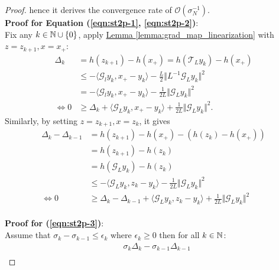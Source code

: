 \documentclass[12pt]{article}
\begin{document}
\begin{proof}
        hence it derives the convergence rate of $\mathcal O(\sigma_{N}^{-1})$. 
        \\
        \textbf{Proof for Equation (\ref*{eqn:st2p-1}, \ref*{eqn:st2p-2})}:
        \\
        Fix any $k \in \mathbb N\cup \{0\}$, apply
        \hyperref[lemma:grad_map_linearization]
        {Lemma \ref*{lemma:grad_map_linearization}}
        with $z = z_{k + 1}, x = x_+$: 
        \begin{align*}
            \Delta_k &= h(z_{k + 1}) - h(x_+) = h(\mathcal T_L y_k) - h(x_+) 
            \\
            &\le 
            - \langle \mathcal G_l y_k, x_+ - y_k \rangle 
            - \frac{L}{2}\Vert L^{-1} \mathcal G_Ly_k\Vert^2
            \\
            &= 
            - \langle \mathcal G_l y_k, x_+ - y_k \rangle 
            - \frac{1}{2L}\Vert \mathcal G_L y_k\Vert^2
            \\
            \iff 
            0& \ge \Delta_k + \langle \mathcal G_L y_k, x_+ - y_k\rangle + \frac{1}{2L}\Vert \mathcal G_L y_k\Vert^2. 
        \end{align*}
        Similarly, by setting $z = z_{k + 1}, x = z_k$, it gives 
        \begin{align*}
            \Delta_k - \Delta_{k - 1} &= 
            h(z_{k + 1}) - h(x_+) - (h(z_k) - h(x_+)) 
            \\
            &= h(z_{k + 1}) - h(z_k)
            \\
            &= h( \mathcal G_L y_k) - h(z_k)
            \\
            &\le 
            - \langle \mathcal G_L y_k, z_k - y_k\rangle - 
            \frac{1}{2L} \Vert \mathcal G_L y_k \Vert^2
            \\
            \iff 
            0 &\ge
            \Delta_k - \Delta_{k - 1}
            + \langle \mathcal G_L y_k, z_k - y_k\rangle
            + \frac{1}{2L} \Vert \mathcal G_L y_k \Vert^2
        \end{align*}
        \\
        \textbf{Proof for (\ref*{eqn:st2p-3})}: 
        \\
        Assume that $\sigma_k - \sigma_{k -1} \le \epsilon_k$ where $\epsilon_k \ge 0$ then for all $k \in \mathbb N$: 
        \begin{align*}
            &
            \sigma_k \Delta_k - \sigma_{k - 1} \Delta_{k - 1}
            \\
            & 

\end{align*}
\end{proof}
\end{document}
